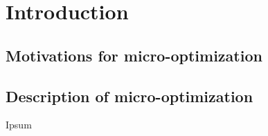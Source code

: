 \chapter{Introduction}

\section{Motivations for micro-optimization}

\section{Description of micro-optimization}\label{ch1:opts}

Ipsum~\cite{article-full}
